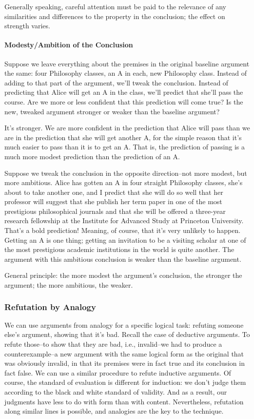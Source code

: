 Generally speaking, careful attention must be paid to the relevance of any similarities and
differences to the property in the conclusion; the effect on strength varies.


\paragraph{Modesty/Ambition of the Conclusion}

Suppose we leave everything about the premises in the original baseline argument the same: four
Philosophy classes, an A in each, new Philosophy class. Instead of adding to that part of the
argument, we'll tweak the conclusion. Instead of predicting that Alice will get an A in the class,
we'll predict that she'll pass the course. Are we more or less confident that this prediction will
come true? Is the new, tweaked argument stronger or weaker than the baseline argument?

It's stronger. We are more confident in the prediction that Alice will pass than we are in the
prediction that she will get another A, for the simple reason that it's much easier to pass than it is
to get an A. That is, the prediction of passing is a much more modest prediction than the prediction
of an A.

Suppose we tweak the conclusion in the opposite direction--not more modest, but more ambitious.
Alice has gotten an A in four straight Philosophy classes, she's about to take another one, and I
predict that she will do so well that her professor will suggest that she publish her term paper in
one of the most prestigious philosophical journals and that she will be offered a three-year research
fellowship at the Institute for Advanced Study at Princeton University. That's a bold prediction!
Meaning, of course, that it's very unlikely to happen. Getting an A is one thing; getting an
invitation to be a visiting scholar at one of the most prestigious academic institutions in the world
is quite another. The argument with this ambitious conclusion is weaker than the baseline
argument.

General principle: the more modest the argument's conclusion, the stronger the argument; the more
ambitious, the weaker.

\subsubsection{Refutation by Analogy}
We can use arguments from analogy for a specific logical task: refuting someone else's argument,
showing that it's bad. Recall the case of deductive arguments. To refute those--to show that they
are bad, i.e., invalid--we had to produce a counterexample--a new argument with the same logical
form as the original that was obviously invalid, in that its premises were in fact true and its
conclusion in fact false. We can use a similar procedure to refute inductive arguments. Of course,
the standard of evaluation is different for induction: we don't judge them according to the black
and white standard of validity. And as a result, our judgments have less to do with form than with
content. Nevertheless, refutation along similar lines is possible, and analogies are the key to the
technique.

